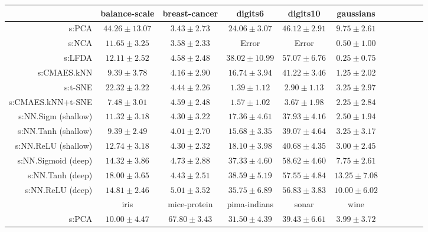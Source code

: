 \begin{table}[ht] \centering
{\small\renewcommand{\arraystretch}{0.7}
\setlength{\tabcolsep}{1pt}
\hspace*{-34pt}
\begin{tabular}{rcccccccccc}
\toprule


& \multicolumn{1}{c}{balance-scale} & \multicolumn{1}{c}{breast-cancer} & \multicolumn{1}{c}{digits6} & \multicolumn{1}{c}{digits10} & \multicolumn{1}{c}{gaussians} \\ 
\midrule
s:PCA & $44.26\pm13.07$ & $\bm{3.43\pm2.73}$ & $24.06\pm3.07$ & $46.12\pm2.91$ & $9.75\pm2.61$ \\
s:NCA & $11.65\pm3.25$ & $3.58\pm2.33$ & Error  & Error  & $0.50\pm1.00$ \\
s:LFDA & $12.11\pm2.52$ & $4.58\pm2.48$ & $38.02\pm10.99$ & $57.07\pm6.76$ & $\bm{0.25\pm0.75}$ \\
s:CMAES.kNN & $9.39\pm3.78$ & $4.16\pm2.90$ & $16.74\pm3.94$ & $41.22\pm3.46$ & $1.25\pm2.02$ \\
s:t-SNE & $22.32\pm3.22$ & $4.44\pm2.26$ & $\bm{1.39\pm1.12}$ & $\bm{2.90\pm1.13}$ & $3.25\pm2.97$ \\
s:CMAES.kNN+t-SNE & $\bm{7.48\pm3.01}$ & $4.59\pm2.48$ & $1.57\pm1.02$ & $3.67\pm1.98$ & $2.25\pm2.84$ \\
s:NN.Sigm (shallow) & $11.32\pm3.18$ & $4.30\pm3.22$ & $17.36\pm4.61$ & $37.93\pm4.16$ & $2.50\pm1.94$ \\
s:NN.Tanh (shallow) & $9.39\pm2.49$ & $4.01\pm2.70$ & $15.68\pm3.35$ & $39.07\pm4.64$ & $3.25\pm3.17$ \\
s:NN.ReLU (shallow) & $12.74\pm3.18$ & $4.30\pm2.32$ & $18.10\pm3.98$ & $40.68\pm4.35$ & $3.00\pm2.45$ \\
s:NN.Sigmoid (deep) & $14.32\pm3.86$ & $4.73\pm2.88$ & $37.33\pm4.60$ & $58.62\pm4.60$ & $7.75\pm2.61$ \\
s:NN.Tanh (deep) & $18.00\pm3.65$ & $4.43\pm2.51$ & $38.59\pm5.19$ & $57.55\pm4.84$ & $13.25\pm7.08$ \\
s:NN.ReLU (deep) & $14.81\pm2.46$ & $5.01\pm3.52$ & $35.75\pm6.89$ & $56.83\pm3.83$ & $10.00\pm6.02$ \\
\midrule
& \multicolumn{1}{c}{iris} & \multicolumn{1}{c}{mice-protein} & \multicolumn{1}{c}{pima-indians} & \multicolumn{1}{c}{sonar} & \multicolumn{1}{c}{wine} \\ 
\midrule
s:PCA & $10.00\pm4.47$ & $67.80\pm3.43$ & $31.50\pm4.39$ & $39.43\pm6.61$ & $3.99\pm3.72$ \\

\end{tabular}}
\end{table}
